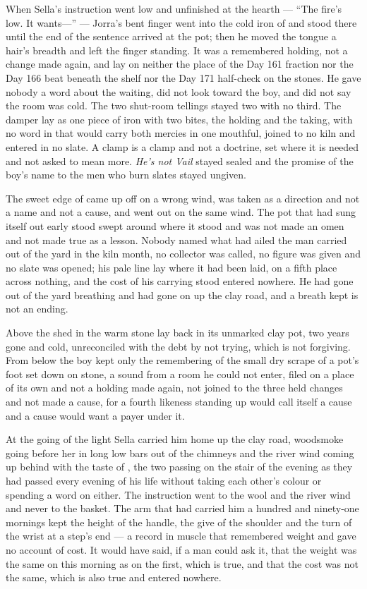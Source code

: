 \scenebreak

When Sella's instruction went low and unfinished at the hearth --- “The fire's low. It wants---” --- Jorra's bent finger went into the cold iron of  and stood there until the end of the sentence arrived at the pot; then he moved the tongue a hair's breadth and left the finger standing. It was a remembered holding, not a change made again, and lay on neither the place of the Day 161 fraction nor the Day 166 beat beneath the shelf nor the Day 171 half-check on the stones. He gave nobody a word about the waiting, did not look toward the boy, and did not say the room was cold. The two shut-room tellings stayed two with no third. The damper lay as one piece of iron with two bites, the holding and the taking, with no word in  that would carry both mercies in one mouthful, joined to no kiln and entered in no slate. A clamp is a clamp and not a doctrine, set where it is needed and not asked to mean more. \emph{He's not Vail} stayed sealed and the promise of the boy's name to the men who burn slates stayed ungiven.

The sweet edge of  came up off  on a wrong wind, was taken as a direction and not a name and not a cause, and went out on the same wind. The pot that had sung itself out early stood swept around where it stood and was not made an omen and not made true as a lesson. Nobody named what had ailed the man carried out of the yard in the kiln month, no collector was called, no figure was given and no slate was opened; his pale line lay where it had been laid, on a fifth place across nothing, and the cost of his carrying stood entered nowhere. He had gone out of the yard breathing and had gone on up the clay road, and a breath kept is not an ending.

Above the shed in  the warm stone lay back in its unmarked clay pot, two years gone and cold, unreconciled with the debt by not trying, which is not forgiving. From below the boy kept only the remembering of the small dry scrape of a pot's foot set down on stone, a sound from a room he could not enter, filed on a place of its own and not a holding made again, not joined to the three held changes and not made a cause, for a fourth likeness standing up would call itself a cause and a cause would want a payer under it.

At the going of the light Sella carried him home up the clay road, woodsmoke going before her in long low bars out of the chimneys and the river wind coming up behind with the taste of , the two passing on the stair of the evening as they had passed every evening of his life without taking each other's colour or spending a word on either. The instruction went to the wool and the river wind and never to the basket. The arm that had carried him a hundred and ninety-one mornings kept the height of the handle, the give of the shoulder and the turn of the wrist at a step's end --- a record in muscle that remembered weight and gave no account of cost. It would have said, if a man could ask it, that the weight was the same on this morning as on the first, which is true, and that the cost was not the same, which is also true and entered nowhere.

